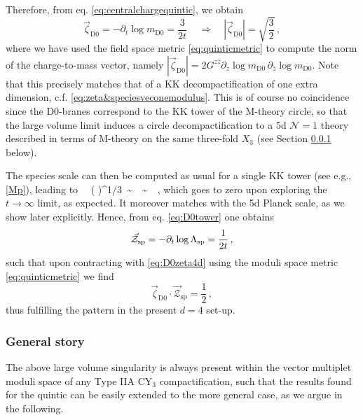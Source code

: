 Therefore, from eq. \eqref{eq:centralchargequintic}, we obtain
%
\begin{equation}\label{eq:D0zeta4d}
	\vec{\zeta}_{\text{D0}} = -\partial_t \log m_{\text{D0}} = \frac{3}{2t}\, \quad \Longrightarrow \quad |\vec{\zeta}_{\text{D0}}| = \sqrt{\frac{3}{2}}\, ,
\end{equation}
%
where  we have used the field space metric \eqref{eq:quinticmetric} to compute the norm of the charge-to-mass vector, namely $|\vec{\zeta}_{\text{D0}}|= 2G^{z\bar z} \partial_z \log m_{\text{D0}}\, \partial_{\bar z} \log m_{\text{D0}}$. Note that this precisely matches that of a KK decompactification of one extra dimension, c.f. \eqref{eq:zeta&speciesveconemodulus}. This is of course no coincidence since the D0-branes correspond to the KK tower of the M-theory circle, so that the large volume limit induces a circle decompactification to a 5d $\mathcal{N}=1$ theory described in terms of M-theory on the same three-fold $X_3$ (see Section \ref{sss:IIA/Mthy} below). 	
	
The species scale can then be computed as usual for a single KK tower (see e.g., \eqref{Mp}), leading to
%
\beq \label{eq:D0tower}
	\, \simeq\, \left(  \right)^{1/3}\, \sim\, \, \sim\, \, ,
\eeq
%
which goes to zero upon exploring the $t \to \infty$ limit, as expected. It moreover matches with the 5d Planck scale, as we show later explicitly. Hence, from eq. \eqref{eq:D0tower} one obtains
%
\begin{equation}\label{eq:D0Zeta4d}
	\vec{\mathcal{Z}}_{\text{sp}} = -\partial_t \log \Lambda_{\text{sp}} = \frac{1}{2t}\, ,
\end{equation}
%
such that upon contracting with \eqref{eq:D0zeta4d} using the moduli space metric \eqref{eq:quinticmetric} we find
%
\begin{equation}
	\vec{\zeta}_{\text{D0}} \cdot \vec{\mathcal{Z}}_{\text{sp}} = \frac{1}{2}\, ,
\end{equation}
%
thus fulfilling the pattern in the present $d=4$ set-up.
	
\subsubsection{General story}
\label{sss:IIA/Mthy}
	
The above large volume singularity is always present within the vector multiplet moduli space of any Type IIA CY$_3$ compactification, such that the results found for the quintic can be easily extended to the more general case, as we argue in the following. 
	
